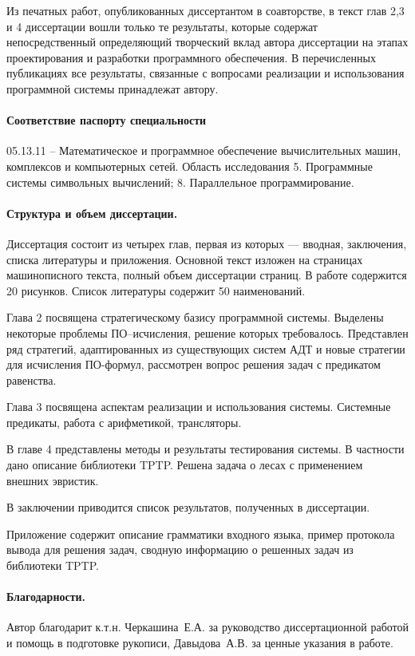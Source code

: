 Из печатных работ, опубликованных диссертантом в соавторстве, в текст глав 2,3 и 4 диссертации вошли только те результаты, которые содержат непосредственный определяющий творческий вклад автора диссертации на этапах проектирования и разработки программного обеспечения. В перечисленных публикациях все результаты, связанные с вопросами реализации и использования программной системы принадлежат автору.

\paragraph{Соответствие паспорту специальности}
05.13.11 -- Математическое и программное обеспечение вычислительных машин, комплексов и компьютерных сетей. Область исследования 5. Программные системы символьных вычислений; 8. Параллельное программирование.

\paragraph{Структура и объем диссертации.} Диссертация состоит из четырех глав, первая из которых --- вводная, заключения, списка литературы и приложения. Основной текст изложен на \pageref{pg:main} страницах машинописного текста, полный объем диссертации \pageref{pg:total} страниц. В работе содержится 20 рисунков. Список литературы содержит 50 наименований.

Глава 2 посвящена стратегическому базису программной системы. Выделены некоторые проблемы ПО--исчисления, решение которых требовалось. Представлен ряд стратегий, адаптированных из существующих систем АДТ и новые стратегии для исчисления ПО-формул, рассмотрен вопрос решения задач с предикатом равенства.

Глава 3 посвящена аспектам реализации и использования системы. Системные предикаты, работа с арифметикой, трансляторы.

В главе 4 представлены методы и результаты тестирования системы. В частности дано описание библиотеки TPTP. Решена задача о лесах с применением внешних эвристик.

В заключении приводится список результатов, полученных в диссертации. %

Приложение содержит описание грамматики входного языка, пример протокола вывода для решения задач, сводную информацию о решенных задач из библиотеки TPTP.

\paragraph{Благодарности.} Автор благодарит к.т.н. Черкашина~Е.А. за руководство диссертационной работой и помощь в подготовке рукописи, Давыдова~А.В. за ценные указания в работе.



